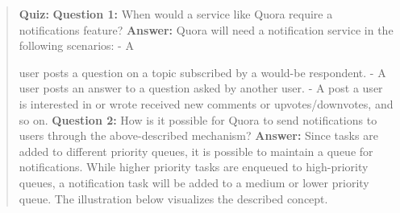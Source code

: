 \begin{quote}
\textbf{Quiz:}
\textbf{Question 1:} When would a service like Quora require a notifications feature?
\textbf{Answer:} Quora will need a notification service in the following scenarios: - A

user posts a question on a topic subscribed by a would-be respondent. - A user posts an answer to a question asked by another user. - A post a user is interested in or wrote received new comments or upvotes/downvotes, and so on.
\textbf{Question 2:} How is it possible for Quora to send notifications to users through the above-described mechanism?
\textbf{Answer:} Since tasks are added to different priority queues, it is possible to maintain a queue for notifications. While higher priority tasks are enqueued to high-priority queues, a notification task will be added to a medium or lower priority queue. The illustration below visualizes the described concept.
\end{quote}

